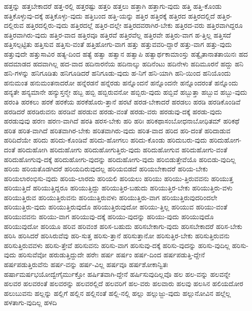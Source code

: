 {ಹತ್ತನ್ನು
ಹತ್ತಬೇಕಾದರೆ
ಹತ್ತ-ರಲ್ಲಿ
ಹತ್ತರಷ್ಟು
ಹತ್ತರಿ
ಹತ್ತಲು
ಹತ್ತಾಗಿ
ಹತ್ತಾಗು-ವುದು
ಹತ್ತಿ
ಹತ್ತಿ-ಕೊಂಡು
ಹತ್ತಿಕೊಳ್ಳುವು-ದಕ್ಕೆ
ಹತ್ತಿಕೊಳ್ಳು-ವುದು
ಹತ್ತಿಬಂದ
ಹತ್ತಿ-ಯನ್ನು
ಹತ್ತಿರ
ಹತ್ತಿರಕ್ಕೆ
ಹತ್ತಿರದ
ಹತ್ತಿರದಲ್ಲಿದೆ
ಹತ್ತಿರ-ದಲ್ಲಿರುವ
ಹತ್ತಿರದಲ್ಲಿರು-ವುದು
ಹತ್ತಿರದಲ್ಲೆ
ಹತ್ತಿರ-ದಲ್ಲೇ
ಹತ್ತಿರದವರಾಗಿರ-ಬೇಕು
ಹತ್ತಿರದ-ವರು
ಹತ್ತಿರವಾಗಿದ್ದರೂ
ಹತ್ತಿರವಾಗಿರು-ವುದು
ಹತ್ತಿರ-ವಾದ
ಹತ್ತಿರವೂ
ಹತ್ತಿರವೆ
ಹತ್ತಿರವೆಲ್ಲ
ಹತ್ತಿರವೇ
ಹತ್ತಿರು-ವಾಗ
ಹ-ತ್ತಿಲ್ಲ
ಹತ್ತಿಸದೆ
ಹತ್ತಿಸಲ್ಪಟ್ಟಿತು
ಹತ್ತಿಸುವ
ಹತ್ತಿಸು-ವಂತೆ
ಹತ್ತಿಹೋಗು-ವಾಗ
ಹತ್ತು
ಹತ್ತುವವರಿ-ದ್ದಾರೆ
ಹತ್ತು-ವಾಗ
ಹತ್ತು-ವುದು
ಹತ್ತುವುದೇ
ಹತ್ತುಸಾವಿರ
ಹತ್ಯ-ದಿಂದ
ಹತ್ಯೆ
ಹತ್ವಾ
ಹತ್ವಾನ
ಹತ್ವಾಪಿ
ಹತ್ವಾರ್ಥಕಾಮಾಂಸ್ತು
ಹತ್ವೈತಾನಾತತಾಯಿನಃ
ಹದ
ಹದಮಾಡದ
ಹದವಾಗಿಲ್ಲ
ಹದ-ವಾದ
ಹದಿನಾರನೆಯ
ಹದಿನಾಲ್ಕು
ಹದಿನೆಂಟು
ಹದಿನೇಳು
ಹದಿಮೂರನೆ
ಹದ್ದು
ಹನಿ
ಹನಿ-ಗಳನ್ನು
ಹನಿಗೂಡಿತು
ಹನಿಗೂಡಿದರೆ
ಹನಿಗೂಡು-ವುದು
ಹ-ನಿಗೆ
ಹನಿ-ಯಾಗಿ
ಹನಿ-ಯಿಂದ
ಹನಿಯೊಂದು
ಹನುಮಂತ
ಹನುಮಂತನಾದರೋ
ಹನ್ನೆರಡನೆ
ಹನ್ನೆರಡು
ಹನ್ನೊಂದನೆ
ಹನ್ನೊಂದನೇ
ಹನ್ನೊಂದರಂತೆ
ಹನ್ನೊಂದು
ಹನ್ಯತೇ
ಹನ್ಯಮಾನೇ
ಹನ್ಯುಸ್ತನ್ಮೇ
ಹಬ್ಬ
ಹಬ್ಬಿ
ಹಬ್ಬಿರುವನೋ
ಹಬ್ಬಿರು-ವುದು
ಹಬ್ಬಿವೆ
ಹಬ್ಬುತ್ತಾ
ಹಬ್ಬುವ
ಹಬ್ಬು-ವುದು
ಹರಂತಿ
ಹರಕಲು
ಹರಕೆ
ಹರಕೆಯ
ಹರಕೆಹೊರು-ತ್ತಾನೆ
ಹರಟೆ
ಹರಡ-ಬೇಕಾದರೆ
ಹರಡಲು
ಹರಡಿ
ಹರಡಿಕೊಂಡಿವೆ
ಹರಡಿದರೆ
ಹರಡಿರುವನು
ಹರಡಿವೆ
ಹರಡುವ
ಹರಡು-ವಂತೆ
ಹರಡು-ವರು
ಹರಡುವು-ದಕ್ಕೆ
ಹರಡು-ವುದು
ಹರಡುವುವು
ಹರಣ
ಹರಣ-ವಾಗಿದೆ
ಹರತಿ
ಹರಸ-ಬೇಕು
ಹರಿ
ಹರಿಃ
ಹರಿಕಥಾಸಂಬೋಧನಾಬೋಧಿತಮ್
ಹರಿಕಥೆ
ಹರಿತ
ಹರಿತ-ವಾಗಿದೆ
ಹರಿತವಾಗಿರ-ಬೇಕು
ಹರಿತವಾಗಿರು-ವುದು
ಹರಿತ-ವಾದ
ಹರಿದ
ಹರಿ-ದಂತೆ
ಹರಿದಾಡುವ
ಹರಿದಿದೆಯೇ
ಹರಿದು
ಹರಿದು-ಕೊಂಡಿವೆ
ಹರಿದು-ಹೋಗಲು
ಹರಿದು-ಕೊಂಡು
ಹರಿದುಬರು-ವುದು
ಹರಿದುಹೋಗ-ದಂತೆ
ಹರಿದುಹೋಗಿ
ಹರಿದುಹೋಗು
ಹರಿದುಹೋಗುತ್ತಿರು-ವುದು
ಹರಿದುಹೋಗುವ
ಹರಿದುಹೋಗು-ವಂತೆ
ಹರಿದುಹೋಗುವು-ದಕ್ಕೆ
ಹರಿದುಹೋಗು-ವುದನ್ನು
ಹರಿದುಹೋಗು-ವುದು
ಹರಿಬಿಡುತ್ತೇವೆಯೊ
ಹರಿಬಿಡು-ವುದಿಲ್ಲ
ಹರಿಯ
ಹರಿಯತೊಡಗಿದರೆ
ಹರಿಯದಿರುವುದಲ್ಲ
ಹರಿಯಬಿಡದೆ
ಹರಿಯಬೇಕಾದರೆ
ಹರಿಯ-ಬೇಕು
ಹರಿಯಲಾರಂಭಿಸು-ವುದು
ಹರಿಯ-ಲಾರದು
ಹರಿಯಲಿ
ಹರಿಯಲು
ಹರಿಯು
ಹರಿಯು-ತ್ತಿರುವವನು
ಹರಿಯುತ್ತ
ಹರಿಯುತ್ತಿದೆ
ಹರಿಯುತ್ತಿದ್ದರೂ
ಹರಿಯುತ್ತಿದ್ದು
ಹರಿಯುತ್ತಿರ-ಬಹುದು
ಹರಿಯುತ್ತಿರ-ಬೇಕು
ಹರಿಯುತ್ತಿರು-ವಳು
ಹರಿಯುತ್ತಿರುವ
ಹರಿಯುತ್ತಿರುವನು
ಹರಿಯುತ್ತಿರುವಳು
ಹರಿಯುತ್ತಿರು-ವಾಗ
ಹರಿಯುತ್ತಿರುವುದರಿಂದಲೇ
ಹರಿಯುತ್ತಿರು-ವುದು
ಹರಿಯುತ್ತಿರುವುದೊ
ಹರಿಯುತ್ತಿರುವುದೋ
ಹರಿಯು-ತ್ತಿಲ್ಲ
ಹರಿಯುವ
ಹರಿಯು-ವಂತೆ
ಹರಿಯುವವನು
ಹರಿಯು-ವಾಗ
ಹರಿಯುವು-ದಕ್ಕೆ
ಹರಿಯು-ವುದನ್ನು
ಹರಿಯು-ವುದು
ಹರಿಯುವುದೊ
ಹರಿಯುವುದೋ
ಹರಿಯೂ
ಹರಿವ
ಹರಿವಂಶ
ಹರಿಸ-ಬಹುದು
ಹರಿಸಬೇಕಾಗು-ವುದು
ಹರಿಸಬೇಕಾದರೆ
ಹರಿಸ-ಬೇಕು
ಹರಿಸಿ
ಹರಿಸಿದರೆ
ಹರಿಸಿರುವೆವು
ಹರಿ-ಸುತ್ತ
ಹರಿಸು-ತ್ತಾನೆ
ಹರಿಸುತ್ತಾನೋ
ಹರಿಸುತ್ತಿರ-ಬೇಕು
ಹರಿಸುತ್ತಿರುವನು
ಹರಿಸುತ್ತಿರುವವಳು
ಹರಿಸು-ತ್ತೇವೆ
ಹರಿಸುವನು
ಹರಿಸು-ವಾಗ
ಹರಿಸುವು-ದಕ್ಕೆ
ಹರಿಸು-ವುದನ್ನು
ಹರಿಸು-ವುದಿಲ್ಲ
ಹರಿಸು-ವುದು
ಹರಿಸುವೆವೋ
ಹರುಡುತ್ತಿದ್ದುದೇ
ಹರೇಃ
ಹರ್ಷ
ಹರ್ಷಂ
ಹರ್ಷ-ದಿಂದ
ಹರ್ಷಪಡುತ್ತಿ-ದ್ದೇನೆ
ಹರ್ಷಪಡುತ್ತಿರುವೆನು
ಹರ್ಷ-ವನ್ನು
ಹರ್ಷ-ವಿಲ್ಲ
ಹರ್ಷವೂ
ಹರ್ಷಶೋಕಾನ್ವಿತಃ
ಹರ್ಷಾಮರ್ಷಭಯೋದ್ವೇಗೈರ್ಮುಕ್ತೋ
ಹರ್ಷಿತವಾಗಿ-ದ್ದೇನೆ
ಹರ್ಷಿಸುವುದಿಲ್ಲವೊ
ಹಲ
ಹಲ-ವನ್ನು
ಹಲವನ್ನೇ
ಹಲವರ
ಹಲವರಂತೆ
ಹಲವರನ್ನು
ಹಲವರಲ್ಲಿದೆ
ಹಲವರಿಗೆ
ಹಲ-ವರು
ಹಲವಾರು
ಹಲವು
ಹಲಸಿನ
ಹಲಿಯದೋರ
ಹಲುಬುವನು
ಹಲ್ಲನ್ನು
ಹಲ್ಲಿಗೆ
ಹಲ್ಲಿನ
ಹಲ್ಲಿನಂತೆ
ಹಲ್ಲಿ-ನಲ್ಲಿ
ಹಲ್ಲು
ಹಲ್ಲುಜ್ಜು-ವುದು
ಹಲ್ಲುನೋವಿನ
ಹಲ್ಲೆಲ್ಲ
ಹಳತಾಗು-ವುದಿಲ್ಲ
ಹಳದಿ
}
